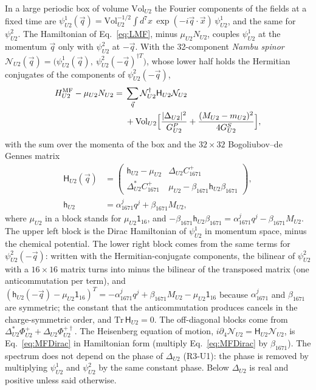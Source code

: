 In a large periodic box of volume $\mathrm{Vol}_{U2}$ the Fourier components of the fields at a
fixed time are $\psi^1_{U2}(\vec q)=\mathrm{Vol}_{U2}^{-1/2}\int d^7x\,\exp(-i\vec q\cdot\vec x)\,
\psi^1_{U2}$, and the same for $\psi^2_{U2}$. The Hamiltonian of Eq.~\eqref{eq:LMF}, minus
$\mu_{U2}N_{U2}$, couples $\psi^1_{U2}$ at the momentum $\vec q$ only with $\psi^2_{U2}$ at
$-\vec q$. With the 32-component \emph{Nambu spinor}
$\mathcal N_{U2}(\vec q)=\big(\psi^1_{U2}(\vec q),\ \psi^2_{U2}(-\vec q)^{\dagger T}\big)$, whose lower
half holds the Hermitian conjugates of the components of $\psi^2_{U2}(-\vec q)$,
\begin{equation}
\begin{aligned}
H^{\rm MF}_{U2}-\mu_{U2}N_{U2}={}&\sum_{\vec q}\mathcal N^\dagger_{U2}\mathsf H_{U2}\mathcal N_{U2}\\
&+\mathrm{Vol}_{U2}\Big[\frac{|\Delta_{U2}|^2}{G^P_{U2}}+\frac{(M_{U2}-m_{U2})^2}{4G^S_{U2}}\Big],
\end{aligned}
\label{eq:HMF}
\end{equation}
with the sum over the momenta of the box and the $32\times32$ Bogoliubov--de Gennes matrix
\begin{equation}
\begin{aligned}
\mathsf H_{U2}(\vec q)&=\begin{pmatrix}\mathsf h_{U2}-\mu_{U2} & \Delta_{U2}C^+_{1671}\\
\Delta^*_{U2}C^+_{1671} & \mu_{U2}-\beta_{1671}\mathsf h_{U2}\beta_{1671}\end{pmatrix},\\
\mathsf h_{U2}&=\alpha^j_{1671}q^j+\beta_{1671}M_{U2},
\end{aligned}
\label{eq:BdG}
\end{equation}
where $\mu_{U2}$ in a block stands for $\mu_{U2}\mathsf 1_{16}$, and
$-\beta_{1671}\mathsf h_{U2}\beta_{1671}=\alpha^j_{1671}q^j-\beta_{1671}M_{U2}$. The upper left block is the
Dirac Hamiltonian of $\psi^1_{U2}$ in momentum space, minus the chemical potential. The lower right
block comes from the same terms for $\psi^2_{U2}(-\vec q)$:
written with the Hermitian-conjugate components, the bilinear of $\psi^2_{U2}$ with a
$16\times16$ matrix turns into minus the bilinear of the transposed matrix (one anticommutation
per term), and $(\mathsf h_{U2}(-\vec q)-\mu_{U2}\mathsf 1_{16})^T=-\alpha^j_{1671}q^j+\beta_{1671}M_{U2}-\mu_{U2}\mathsf 1_{16}$
because $\alpha^j_{1671}$ and $\beta_{1671}$ are symmetric; the constant that the anticommutation
produces cancels in the charge-symmetric order, and $\mathrm{Tr}\,\mathsf H_{U2}=0$. The
off-diagonal blocks come from $\Delta^*_{U2}\Phi^+_{U2}+\Delta_{U2}\Phi^{+\dagger}_{U2}$. The
Heisenberg equation of motion, $i\partial_4\mathcal N_{U2}=\mathsf H_{U2}\mathcal N_{U2}$, is
Eq.~\eqref{eq:MFDirac} in Hamiltonian form (multiply Eq.~\eqref{eq:MFDirac} by
$\beta_{1671}$). The spectrum does not depend on the phase of $\Delta_{U2}$ (R3-U1): the phase is
removed by multiplying $\psi^1_{U2}$ and $\psi^2_{U2}$ by the same constant phase. Below
$\Delta_{U2}$ is real and positive unless said otherwise.

